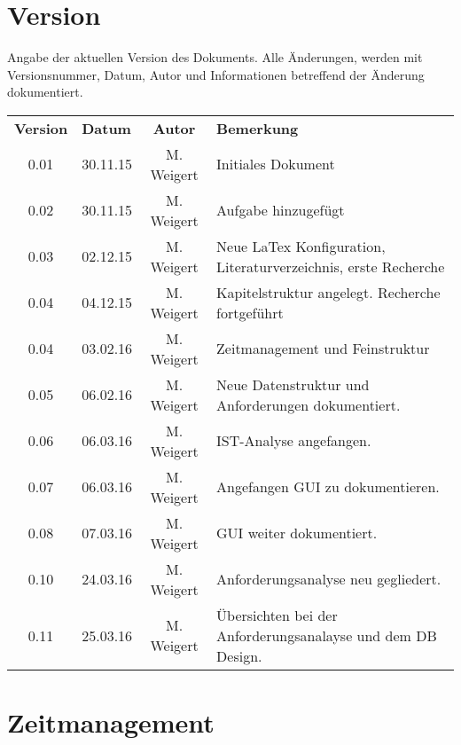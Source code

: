\chapter*{Version}

Angabe der aktuellen Version des Dokuments. Alle Änderungen, werden mit Versionsnummer, Datum, Autor und Informationen betreffend der Änderung dokumentiert.\\

\begin{tabular}{|c|l|c|l|}
	\rowcolor{black} {\color{white}\textbf{Version}} & {\color{white}\textbf{Datum}} & {\color{white}\textbf{Autor}} & {\color{white}\textbf{Bemerkung}} \\
	0.01 & 30.11.15 & M. Weigert & Initiales Dokument \\ \hline
	\rowcolor{DarkSeaGreen} 0.02 & 30.11.15 & M. Weigert & Aufgabe hinzugefügt \\ \hline
	0.03 & 02.12.15 & M. Weigert & Neue LaTex Konfiguration, Literaturverzeichnis, erste Recherche \\ \hline
	\rowcolor{DarkSeaGreen} 0.04 & 04.12.15 & M. Weigert & Kapitelstruktur angelegt. Recherche fortgeführt \\ \hline
	0.04 & 03.02.16 & M. Weigert & Zeitmanagement und Feinstruktur \\ \hline
	\rowcolor{DarkSeaGreen} 0.05 & 06.02.16 & M. Weigert & Neue Datenstruktur und Anforderungen dokumentiert. \\ \hline
	0.06 & 06.03.16 & M. Weigert & IST-Analyse angefangen. \\ \hline
	\rowcolor{DarkSeaGreen} 0.07 & 06.03.16 & M. Weigert & Angefangen GUI zu dokumentieren. \\ \hline
	0.08 & 07.03.16 & M. Weigert & GUI weiter dokumentiert. \\ \hline
	\rowcolor{DarkSeaGreen} 0.10 & 24.03.16 & M. Weigert & Anforderungsanalyse neu gegliedert. \\ \hline
	0.11 & 25.03.16 & M. Weigert & Übersichten bei der Anforderungsanalayse und dem DB Design. \\ \hline
\end{tabular}

\chapter*{Zeitmanagement}

